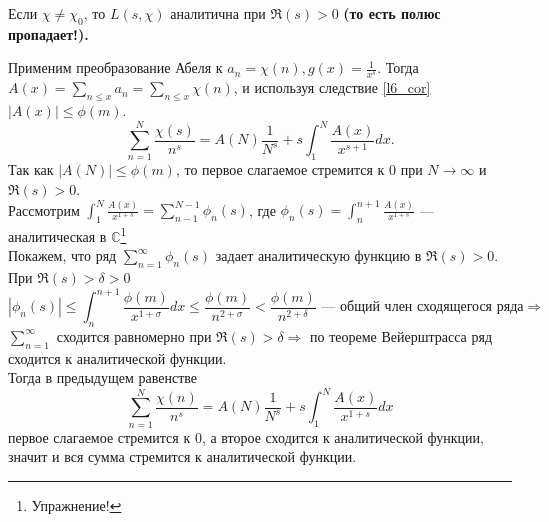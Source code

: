 \begin{lemma} \label{l7_lm6}
	Если $\chi \ne \chi_0$, то $L(s, \chi)$ аналитична при $\Re(s) > 0$ \bf (то есть полюс пропадает!).
\end{lemma}
\begin{pf}
	Применим преобразование Абеля к $\displaystyle a_n = \chi(n), g(x) = \frac{1}{x^s}$. Тогда $\displaystyle A(x) = \sum_{n \leq x} a_n = \sum_{n \leq x} \chi(n)$, и используя следствие \ref{l6_cor} $|A(x)| \leq \phi(m)$.
	$$\sum_{n = 1}^{N} \frac{\chi(s)}{n^s} = A(N) \frac{1}{N^s} + s \int_{1}^{N} \frac{A(x)}{x^{s + 1}} dx.$$
	Так как $|A(N)| \leq \phi(m)$, то первое слагаемое стремится к $0$ при $N \rightarrow \infty$ и $\Re(s) > 0$.\\
	Рассмотрим $\displaystyle \int_1^N \frac{A(x)}{x^{1 + s}} = \sum_{n - 1}^{N - 1} \phi_n(s)$, где $\displaystyle \phi_n(s) = \int_{n}^{n + 1} \frac{A(x)}{x^{1 + s}}$ — аналитическая в $\mathbb{C}$\footnote{Упражнение!}\\
	Покажем, что ряд $\displaystyle \sum_{n = 1}^{\infty} \phi_n(s)$ задает аналитическую функцию в $\Re(s) > 0$. При $\Re(s) > \delta > 0$
	$$|\phi_n(s)| \leq \int_n^{n + 1} \frac{\phi(m)}{x^{1 + \sigma}} dx \leq  \frac{\phi(m)}{n^{2 + \sigma}} < \frac{\phi(m)}{n^{2 + \delta}} \text{ —  общий член сходящегося ряда} \Rightarrow$$
	$\displaystyle \sum_{n = 1}^{\infty}$ сходится равномерно при $\Re(s) > \delta \Rightarrow$ по теореме Вейерштрасса ряд сходится к аналитической функции.\\
	Тогда в предыдущем равенстве
	$$\sum_{n = 1}^{N} \frac{\chi(n)}{n^s} = A(N) \frac{1}{N^s} + s \int_{1}^{N} \frac{A(x)}{x^{1 + s}} dx$$
	первое слагаемое стремится к 0, а второе сходится к аналитической функции, значит и вся сумма стремится к аналитической функции.
\end{pf}


